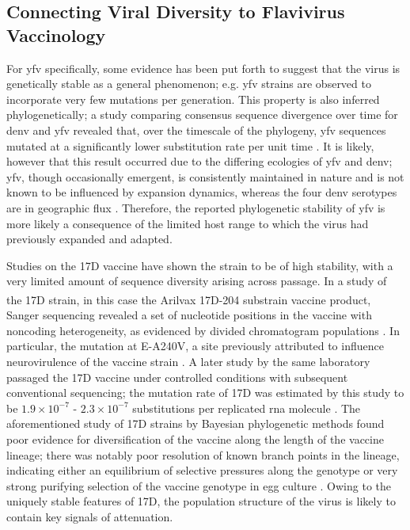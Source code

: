 \subsection{Connecting Viral Diversity to Flavivirus Vaccinology}
For \gls{yfv} specifically, some evidence has been put forth to suggest that the virus is genetically stable as a general phenomenon; e.g. \gls{yfv} strains are observed to incorporate very few mutations per generation. This property is also inferred phylogenetically; a study comparing consensus sequence divergence over time for \gls{denv} and \gls{yfv} revealed that, over the timescale of the phylogeny, \gls{yfv} sequences mutated at a significantly lower substitution rate per unit time \parencite{Sall:2010db}. It is likely, however that this result occurred due to the differing ecologies of \gls{yfv} and \gls{denv}; \gls{yfv}, though occasionally emergent, is consistently maintained in nature and is not known to be influenced by expansion dynamics, whereas the four \gls{denv} serotypes are in geographic flux \parencite{Messina:2014jo, Afreen:2015hj}. Therefore, the reported phylogenetic stability of \gls{yfv} is more likely a consequence of the limited host range to which the virus had previously expanded and adapted. 

Studies on the 17D vaccine have shown the strain to be of high stability, with a very limited amount of sequence diversity arising across passage. In a study of the 17D strain, in this case the Arilvax\textsuperscript{\textregistered} 17D-204 substrain vaccine product, Sanger sequencing revealed a set of nucleotide positions in the vaccine with noncoding heterogeneity, as evidenced by divided chromatogram populations \parencite{Pugachev:2002vu}. In particular, the mutation at E-A240V, a site previously attributed to influence neurovirulence of the vaccine strain \parencite{Ryman:1997fh}. A later study by the same laboratory passaged the 17D vaccine under controlled conditions with subsequent conventional sequencing; the mutation rate of 17D was estimated by this study to be $1.9 \times 10^{-7}$ - $2.3 \times 10^{-7}$ substitutions per replicated \gls{rna} molecule \parencite{Pugachev:2003fj}. The aforementioned study of 17D strains by Bayesian phylogenetic methods found poor evidence for diversification of the vaccine along the length of the vaccine lineage; there was notably poor resolution of known branch points in the lineage, indicating either an equilibrium of selective pressures along the genotype or very strong purifying selection of the vaccine genotype in egg culture \parencite{Stock:2012gp}. Owing to the uniquely stable features of 17D, the population structure of the virus is likely to contain key signals of attenuation.

